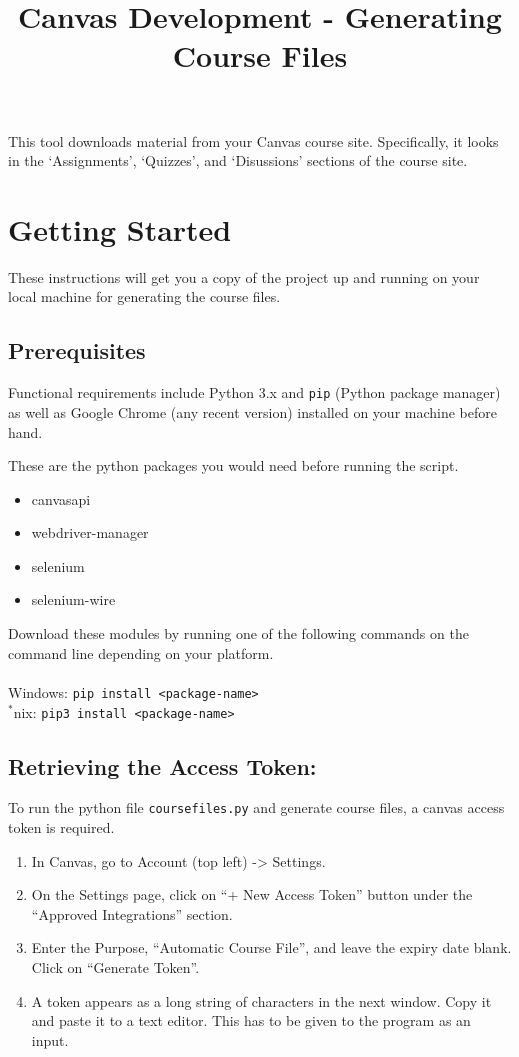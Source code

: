 \documentclass{article}
\date{}
\title{Canvas Development - Generating Course
Files}
\begin{document}
\maketitle
This tool downloads material from your Canvas course site. Specifically,
it looks in the `Assignments', `Quizzes', and `Disussions' sections of
the course site.

\section{Getting Started}

These instructions will get you a copy of the project up and running on
your local machine for generating the course files.

\subsection{Prerequisites}

Functional requirements include Python 3.x and \texttt{pip} (Python
package manager) as well as Google Chrome (any recent version) installed
on your machine before hand.

These are the python packages you would need before running the script.

\begin{itemize}
\item
  canvasapi
\item
  webdriver-manager
\item
  selenium
\item
  selenium-wire
\end{itemize}

Download these modules by running one of the following commands on the
command line depending on your platform.
\\\\Windows: \texttt{pip\ install\ \textless{}package-name\textgreater{}}
\\$^*$nix: \texttt{pip3\ install\ \textless{}package-name\textgreater{}}

\subsection{Retrieving the Access
Token:}

To run the python file \texttt{coursefiles.py} and generate course
files, a canvas access token is required.

\begin{enumerate}
\def\labelenumi{\arabic{enumi}.}
\item
  In Canvas, go to Account (top left) -\textgreater{} Settings.
\item
  On the Settings page, click on ``+ New Access Token'' button under the
  ``Approved Integrations'' section.
\item
  Enter the Purpose, ``Automatic Course File'', and leave the expiry
  date blank. Click on ``Generate Token''.
\item
  A token appears as a long string of characters in the next window.
  Copy it and paste it to a text editor. This has to be given to the
  program as an input.
\end{enumerate}
\end{document}
